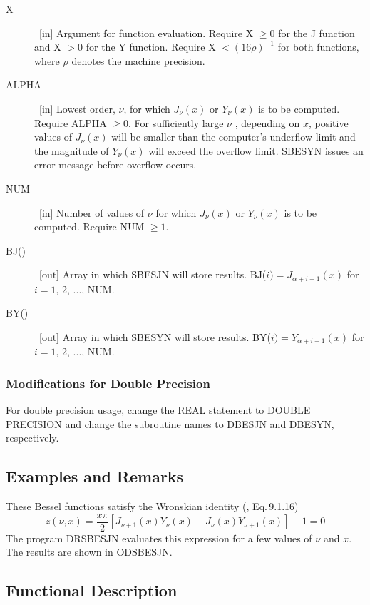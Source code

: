 \documentclass[twoside]{MATH77}
\begin{document}
\begin{description}
\item[X]  \ [in] Argument for function evaluation. Require X $\geq 0$ for
the J function and X $>0$ for the Y function. Require X $<(16\rho
)^{-1}$ for both functions, where $\rho $ denotes the machine
precision.

\item[ALPHA]  \ [in] Lowest order, $\nu $, for which $J_\nu (x)$ or $Y_\nu
(x)$ is to be computed. Require ALPHA $\geq 0$. For sufficiently large $\nu $%
, depending on $x$, positive values of $J_\nu (x)$ will be smaller than the
computer's underflow limit and the magnitude of $Y_\nu (x)$ will exceed the
overflow limit. SBESYN issues an error message before overflow occurs.

\item[NUM]  \ [in] Number of values of $\nu $ for which $J_\nu (x)$ or $%
Y_\nu (x)$ is to be computed. Require NUM $\geq 1.$

\item[BJ()]  \ [out] Array in which SBESJN will store results. BJ($%
i)=J_{\alpha +i-1}(x)$ for $i=1$, 2, ..., NUM.

\item[BY()]  \ [out] Array in which SBESYN will store results. BY($%
i)=Y_{\alpha +i-1}(x)$ for $i=1$, 2, ..., NUM.
\end{description}

\subsubsection{Modifications for Double Precision}

For double precision usage, change the REAL statement to DOUBLE PRECISION
and change the subroutine names to DBESJN and DBESYN, respectively.

\subsection{Examples and Remarks}

These Bessel functions satisfy the Wronskian identity (\cite{ams55:bes},
Eq.\,9.1.16)
\begin{equation*}
z(\nu ,x) = \frac{x\pi }{2} \left[J_{\nu +1}(x) Y_\nu (x) - J_\nu (x) Y_{\nu
+1}(x)\right] - 1 = 0
\end{equation*}
The program DRSBESJN evaluates this expression for a few values of $\nu $
and $x$. The results are shown in ODSBESJN.

\subsection{Functional Description}
\end{document}
